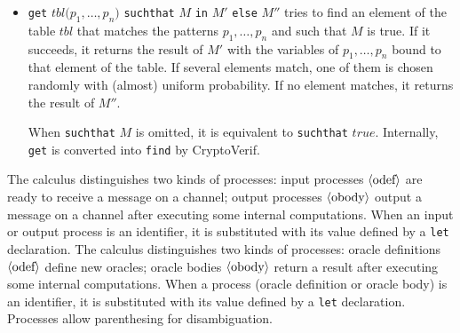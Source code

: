 \begin{itemize}
\item \texttt{get} $\mathit{tbl}\texttt{(}p_1, \ldots, p_n\texttt{)}$ \texttt{suchthat} $M$ \texttt{in} $M'$ \texttt{else} $M''$ tries to find an element of the table $\mathit{tbl}$ that matches the patterns $p_1, \ldots, p_n$ and such that $M$ is true. If it succeeds, it returns the result of $M'$ with the variables of $p_1, \ldots, p_n$ bound to that element of the table. If several elements match, one of them is chosen randomly with (almost) uniform probability. If no element matches, it returns the result of $M''$. 

When \texttt{suchthat} $M$ is omitted, it is equivalent to \texttt{suchthat} $\mathit{true}$. Internally, \texttt{get} is converted into \texttt{find} by CryptoVerif.

\end{itemize}

\ifchannels
The calculus distinguishes two kinds of processes: input processes
$\langle\textrm{odef}\rangle$ are ready to receive a message on a channel; 
output processes $\langle\textrm{obody}\rangle$ 
output a message on a channel after executing some internal computations.
When an input or output process is an identifier, it is substituted with 
its value defined by a \texttt{let} declaration.
\else
The calculus distinguishes two kinds of processes: oracle definitions
$\langle\textrm{odef}\rangle$ define new oracles; oracle bodies $\langle\textrm{obody}\rangle$ return a
result after executing some internal computations.  When a process
(oracle definition or oracle body) is an identifier, it is substituted
with its value defined by a \texttt{let} declaration.
\fi
Processes allow parenthesing for disambiguation.


